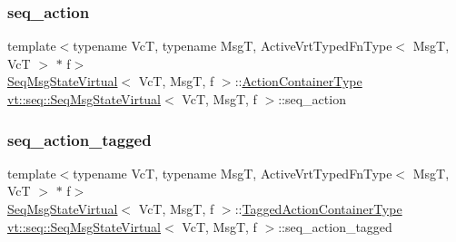 \subsubsection{\texorpdfstring{seq\+\_\+action}{seq\_action}}
{\footnotesize\ttfamily template$<$typename VcT, typename MsgT, Active\+Vrt\+Typed\+Fn\+Type$<$ Msg\+T, Vc\+T $>$ $\ast$ f$>$ \\
\hyperlink{structvt_1_1seq_1_1_seq_msg_state_virtual}{Seq\+Msg\+State\+Virtual}$<$ VcT, MsgT, f $>$\+::\hyperlink{structvt_1_1seq_1_1_seq_msg_state_virtual_aa60e119bc842980c949be50663b04b7a}{Action\+Container\+Type} \hyperlink{structvt_1_1seq_1_1_seq_msg_state_virtual}{vt\+::seq\+::\+Seq\+Msg\+State\+Virtual}$<$ VcT, MsgT, f $>$\+::seq\+\_\+action\hspace{0.3cm}{\ttfamily [static]}}

\mbox{\label{structvt_1_1seq_1_1_seq_msg_state_virtual_aaa24831f6dc9810cb8e2b8aac13ce77d}} 
\subsubsection{\texorpdfstring{seq\+\_\+action\+\_\+tagged}{seq\_action\_tagged}}
{\footnotesize\ttfamily template$<$typename VcT, typename MsgT, Active\+Vrt\+Typed\+Fn\+Type$<$ Msg\+T, Vc\+T $>$ $\ast$ f$>$ \\
\hyperlink{structvt_1_1seq_1_1_seq_msg_state_virtual}{Seq\+Msg\+State\+Virtual}$<$ VcT, MsgT, f $>$\+::\hyperlink{structvt_1_1seq_1_1_seq_msg_state_virtual_a1298c226eeddc2e8fbd58bf1b92ef2aa}{Tagged\+Action\+Container\+Type} \hyperlink{structvt_1_1seq_1_1_seq_msg_state_virtual}{vt\+::seq\+::\+Seq\+Msg\+State\+Virtual}$<$ VcT, MsgT, f $>$\+::seq\+\_\+action\+\_\+tagged\hspace{0.3cm}{\ttfamily [static]}}

\mbox{\label{structvt_1_1seq_1_1_seq_msg_state_virtual_a54746af8c25caba7b053524f19201e72}} 
